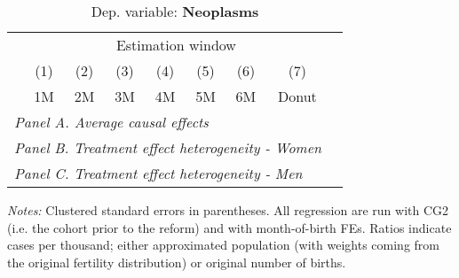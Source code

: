  \begin{table}[H] \begin{threeparttable} \centering \caption{Dep. variable: \textbf{Neoplasms}} {\def\sym#1{\ifmmode^{#1}\else\(^{#1}\)\fi} \begin{tabular}{l*{8}{c}} \toprule & \multicolumn{7}{c}{Estimation window} \\ \cmidrule(lr){2-8}
            &\multicolumn{1}{c}{(1)}&\multicolumn{1}{c}{(2)}&\multicolumn{1}{c}{(3)}&\multicolumn{1}{c}{(4)}&\multicolumn{1}{c}{(5)}&\multicolumn{1}{c}{(6)}&\multicolumn{1}{c}{(7)}\\
            &\multicolumn{1}{c}{1M}&\multicolumn{1}{c}{2M}&\multicolumn{1}{c}{3M}&\multicolumn{1}{c}{4M}&\multicolumn{1}{c}{5M}&\multicolumn{1}{c}{6M}&\multicolumn{1}{c}{Donut}\\
\midrule
 \multicolumn{8}{l}{\emph{Panel A. Average causal effects}} \\       \midrule\multicolumn{8}{l}{\emph{Panel B. Treatment effect heterogeneity - Women}} \\       \midrule\multicolumn{8}{l}{\emph{Panel C. Treatment effect heterogeneity - Men}} \\       
\bottomrule \end{tabular} } \begin{tablenotes} \item \scriptsize \emph{Notes:} Clustered standard errors in parentheses. All regression are run with CG2 (i.e. the cohort prior to the reform) and with month-of-birth FEs. Ratios indicate cases per thousand; either approximated population (with weights coming from the original fertility distribution) or original number of births. \end{tablenotes} \end{threeparttable} \end{table} 
